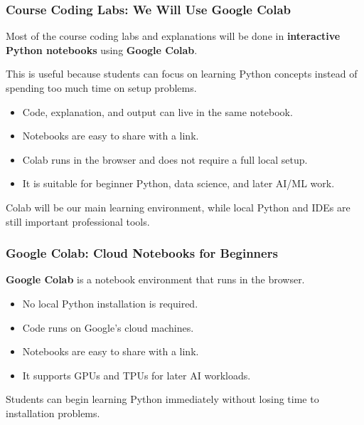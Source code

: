 \documentclass[aspectratio=169,10pt]{beamer}
\newcommand{\keyword}[1]{\textcolor{PrimaryBlue}{\textbf{#1}}}
\begin{document}
\begin{frame}
\frametitle{Course Coding Labs: We Will Use Google Colab}
\vspace{0.55cm}
Most of the course coding labs and explanations will be done in \keyword{interactive Python notebooks} using \keyword{Google Colab}.
\vspace{0.22cm}

This is useful because students can focus on learning Python concepts instead of spending too much time on setup problems.
\vspace{0.25cm}
\begin{itemize}\setlength\itemsep{0.13cm}
  \item Code, explanation, and output can live in the same notebook.
  \item Notebooks are easy to share with a link.
  \item Colab runs in the browser and does not require a full local setup.
  \item It is suitable for beginner Python, data science, and later AI/ML work.
\end{itemize}
\vspace{0.3cm}
\begin{tcolorbox}[lecturebox,title=Main message]
Colab will be our main learning environment, while local Python and IDEs are still important professional tools.
\end{tcolorbox}
\end{frame}


\begin{frame}
\frametitle{Google Colab: Cloud Notebooks for Beginners}
\vspace{0.68cm}
\keyword{Google Colab} is a notebook environment that runs in the browser.
\begin{itemize}\setlength\itemsep{0.13cm}
  \item No local Python installation is required.
  \item Code runs on Google's cloud machines.
  \item Notebooks are easy to share with a link.
  \item It supports GPUs and TPUs for later AI workloads.
\end{itemize}
\vspace{0.34cm}
\begin{tcolorbox}[lecturebox,title=Why this matters in Module 1]
Students can begin learning Python immediately without losing time to installation problems.
\end{tcolorbox}
\end{frame}
\end{document}
